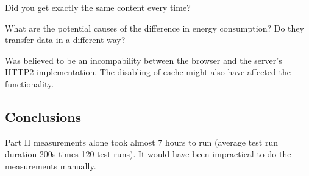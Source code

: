 \documentclass{article}
\begin{document}
Did you get exactly the same content every time?

What are the potential causes of the difference in energy consumption? Do they transfer data in a different way?

Was believed to be an incompability between the browser and the server's HTTP2 implementation. The disabling of cache might also have affected the functionality.

\subsection{Conclusions}
\label{chapter:conclusions}

Part II measurements alone took almost 7 hours to run (average test run duration 200s times 120 test runs). It would have been impractical to do the measurements manually.




\end{document}
